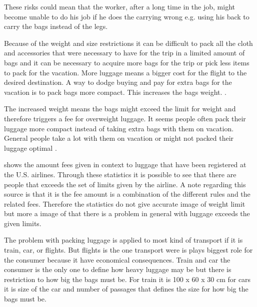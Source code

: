 These risks could mean that the worker, after a long time in the job, might become unable to do his job if he does the carrying wrong e.g. using his back to carry the bags instead of the legs.

Because of the weight and size restrictions it can be difficult to pack all the cloth and accessories that were necessary to have for the trip in a limited amount of bags and it can be necessary to acquire more bags for the trip or pick less items to pack for the vacation. More luggage means a bigger cost for the flight to the desired destination. A way to dodge buying and pay for extra bags for the vacation is to pack bags more compact. This increases the bags weight. \citep{altombag}.

The increased weight means the bags might exceed the limit for weight and therefore triggers a fee for overweight luggage.
It seems people often pack their luggage more compact instead of taking extra bags with them on vacation. General people take a lot with them on vacation or might not packed their luggage optimal \citep{airstat}.

\citep{airstat} shows the amount fees given in context to luggage that have been registered at the U.S. airlines. Through these statistics it is possible to see that there are people that exceeds the set of limits given by the airline. A note regarding this source is that it is the fee amount is a combination of the different rules and the related fees. Therefore the statistics do not give accurate image of weight limit but more a image of that there is a problem in general with luggage exceeds the given limits.

The problem with packing luggage is applied to most kind of transport if it is train, car, or flights. But flights is the one transport were is plays biggest role for the consumer because it have economical consequences. Train and car the consumer is the only one to define how heavy luggage may be but there is restriction to how big the bags must be. For train it is 100 x 60 x 30 cm \citep{rulestrain} for cars it is size of the car and number of passages that defines the size for how big the bags must be.